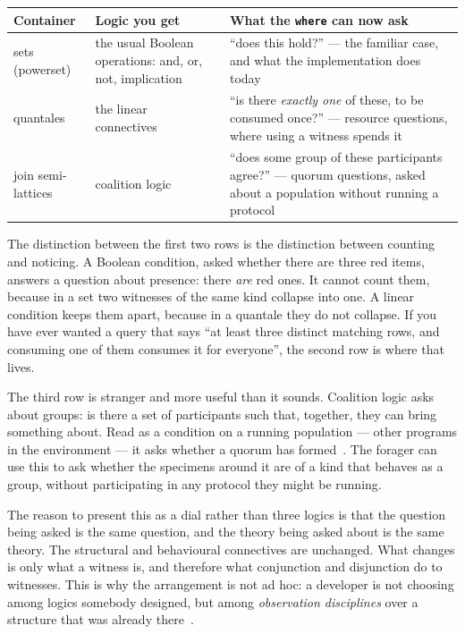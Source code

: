 \begin{center}
\small
\begin{tabular}{@{}L{0.24\textwidth}L{0.28\textwidth}L{0.40\textwidth}@{}}
\toprule
\textbf{Container} & \textbf{Logic you get} & \textbf{What the \texttt{where} can now ask} \\
\midrule
sets (powerset) &
the usual Boolean operations: and, or, not, implication &
``does this hold?'' --- the familiar case, and what the implementation does
today \\[3pt]
quantales~\cite{Rosenthal90,Yetter90} &
the linear connectives~\cite{Girard87} &
``is there \emph{exactly one} of these, to be consumed once?'' --- resource
questions, where using a witness spends it \\[3pt]
join semi-lattices &
coalition logic~\cite{Pauly02,GabbayLosa} &
``does some group of these participants agree?'' --- quorum questions, asked
about a population without running a protocol \\
\bottomrule
\end{tabular}
\end{center}

The distinction between the first two rows is the distinction between counting
and noticing. A Boolean condition, asked whether there are three red items,
answers a question about presence: there \emph{are} red ones. It cannot count
them, because in a set two witnesses of the same kind collapse into one. A linear
condition keeps them apart, because in a quantale they do not collapse. If you
have ever wanted a query that says ``at least three distinct matching rows, and
consuming one of them consumes it for everyone'', the second row is where that
lives.

The third row is stranger and more useful than it sounds. Coalition logic asks
about groups: is there a set of participants such that, together, they can bring
something about. Read as a condition on a running population --- other programs
in the environment --- it asks whether a quorum has formed~\cite{HerdNote}. The forager can use
this to ask whether the specimens around it are of a kind that behaves as a
group, without participating in any protocol they might be running.

\begin{remark}
The reason to present this as a dial rather than three logics is that the
question being asked is the same question, and the theory being asked about is
the same theory. The structural and behavioural connectives are unchanged. What
changes is only what a witness is, and therefore what conjunction and
disjunction do to witnesses. This is why the arrangement is not ad hoc: a
developer is not choosing among logics somebody designed, but among
\emph{observation disciplines} over a structure that was already
there~\cite{ObsDisc}.
\end{remark}

